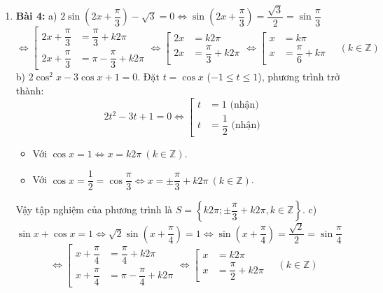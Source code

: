 \documentclass[12pt, a4paper]{article}
\begin{document}
\begin{enumerate}[leftmargin=0.6cm]
    \item \textbf{Bài 4:}  
    a) $2\sin\left(2x + \dfrac{\pi}{3}\right) - \sqrt{3} = 0 \iff \sin\left(2x + \dfrac{\pi}{3}\right) = \dfrac{\sqrt{3}}{2} = \sin\dfrac{\pi}{3}$  
    $$\iff \left[\begin{aligned} 2x + \dfrac{\pi}{3} &= \dfrac{\pi}{3} + k2\pi \\ 2x + \dfrac{\pi}{3} &= \pi - \dfrac{\pi}{3} + k2\pi \end{aligned}\right. \iff \left[\begin{aligned} 2x &= k2\pi \\ 2x &= \dfrac{\pi}{3} + k2\pi \end{aligned}\right. \iff \left[\begin{aligned} x &= k\pi \\ x &= \dfrac{\pi}{6} + k\pi \end{aligned}\right. \quad (k \in \mathbb{Z})$$  
    b) $2\cos^2 x - 3\cos x + 1 = 0$. Đặt $t = \cos x$ ($-1 \le t \le 1$), phương trình trở thành:  
    $$2t^2 - 3t + 1 = 0 \iff \left[\begin{aligned} t &= 1 \text{ (nhận)} \\ t &= \dfrac{1}{2} \text{ (nhận)} \end{aligned}\right.$$  
    \begin{itemize}  
        \item Với $\cos x = 1 \iff x = k2\pi \ (k \in \mathbb{Z})$.  
        \item Với $\cos x = \dfrac{1}{2} = \cos\dfrac{\pi}{3} \iff x = \pm\dfrac{\pi}{3} + k2\pi \ (k \in \mathbb{Z})$.  
    \end{itemize}  
    Vậy tập nghiệm của phương trình là $S = \left\{k2\pi; \pm\dfrac{\pi}{3} + k2\pi, k \in \mathbb{Z}\right\}$.  
    c) $\sin x + \cos x = 1 \iff \sqrt{2}\sin\left(x + \dfrac{\pi}{4}\right) = 1 \iff \sin\left(x + \dfrac{\pi}{4}\right) = \dfrac{\sqrt{2}}{2} = \sin\dfrac{\pi}{4}$  
    $$\iff \left[\begin{aligned} x + \dfrac{\pi}{4} &= \dfrac{\pi}{4} + k2\pi \\ x + \dfrac{\pi}{4} &= \pi - \dfrac{\pi}{4} + k2\pi \end{aligned}\right. \iff \left[\begin{aligned} x &= k2\pi \\ x &= \dfrac{\pi}{2} + k2\pi \end{aligned}\right. \quad (k \in \mathbb{Z})$$  
\end{enumerate}  
  
\end{document}
